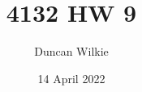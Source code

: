 \documentclass{article}
\title{4132 HW 9}
\author{Duncan Wilkie}
\date{14 April 2022}
\begin{document}
\maketitle

\section*{}
\end{document}
